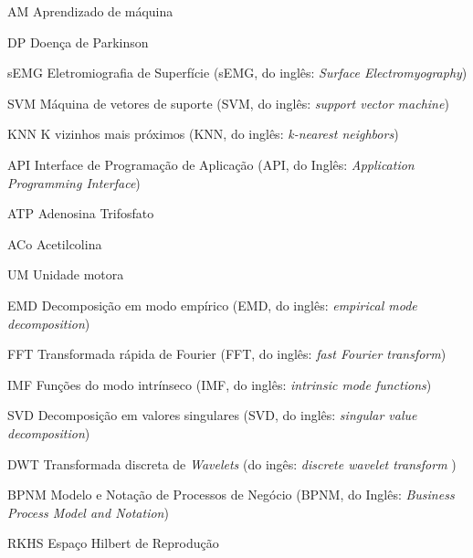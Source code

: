 \begin{siglas}
  \item[AM] Aprendizado de máquina
  \item[DP] Doença de Parkinson
  \item[sEMG] Eletromiografia de Superfície (sEMG, do inglês: \textit{Surface Electromyography})
  \item[SVM] Máquina de vetores de suporte (SVM, do inglês: \textit{support vector machine}) 
  \item[KNN] K vizinhos mais próximos (KNN, do inglês: \textit{k-nearest neighbors}) 
  \item[API] Interface de Programação de Aplicação (API, do Inglês: \textit{Application Programming Interface})
  \item[ATP] Adenosina Trifosfato
  \item[ACo] Acetilcolina
  \item[UM] Unidade motora
  \item[EMD] Decomposição em modo empírico (EMD, do inglês: \textit{empirical mode decomposition})
  \item[FFT] Transformada rápida de Fourier (FFT, do inglês: \textit{fast Fourier transform}) 
  \item[IMF] Funções do modo intrínseco (IMF, do inglês: \textit{intrinsic mode functions})
  \item[SVD] Decomposição em valores singulares (SVD, do inglês: \textit{singular value decomposition})
  \item[DWT] Transformada discreta de \textit{Wavelets} (do ingês: \textit{discrete wavelet transform })
  \item[BPNM] Modelo e Notação de Processos de Negócio (BPNM, do Inglês: \textit{Business Process Model and Notation})
  \item[RKHS] Espaço Hilbert de Reprodução
\end{siglas}
